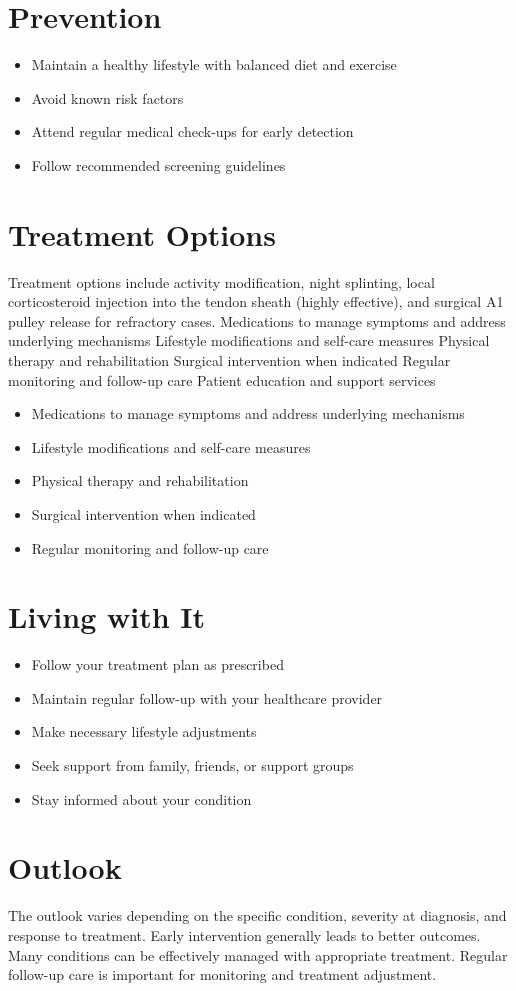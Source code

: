 \section{Prevention}
\begin{itemize}[noitemsep]
  \item Maintain a healthy lifestyle with balanced diet and exercise
  \item Avoid known risk factors
  \item Attend regular medical check-ups for early detection
  \item Follow recommended screening guidelines
\end{itemize}
\section{Treatment Options}
Treatment options include activity modification, night splinting, local corticosteroid injection into the tendon sheath (highly effective), and surgical A1 pulley release for refractory cases. Medications to manage symptoms and address underlying mechanisms Lifestyle modifications and self-care measures Physical therapy and rehabilitation Surgical intervention when indicated Regular monitoring and follow-up care Patient education and support services

\begin{itemize}[noitemsep]
  \item Medications to manage symptoms and address underlying mechanisms
  \item Lifestyle modifications and self-care measures
  \item Physical therapy and rehabilitation
  \item Surgical intervention when indicated
  \item Regular monitoring and follow-up care
\end{itemize}
\section{Living with It}
\begin{itemize}[noitemsep]
  \item Follow your treatment plan as prescribed
  \item Maintain regular follow-up with your healthcare provider
  \item Make necessary lifestyle adjustments
  \item Seek support from family, friends, or support groups
  \item Stay informed about your condition
\end{itemize}
\section{Outlook}
The outlook varies depending on the specific condition, severity at diagnosis, and response to treatment. Early intervention generally leads to better outcomes. Many conditions can be effectively managed with appropriate treatment. Regular follow-up care is important for monitoring and treatment adjustment.
